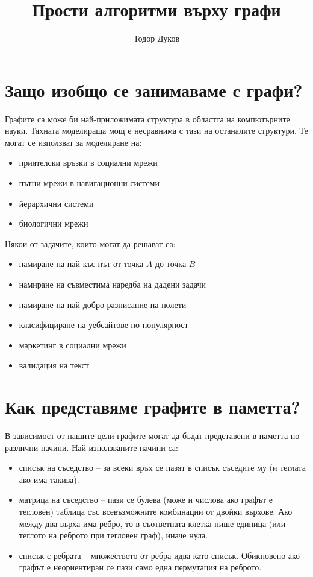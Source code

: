 \documentclass{article}
\title{Прости алгоритми върху графи}
\author{Тодор Дуков}
\date{}
\theoremstyle{definition}
\theoremstyle{plain}
\theoremstyle{remark}
\theoremstyle{definition}
\begin{document}
\maketitle

\section*{Защо изобщо се занимаваме с графи?}

Графите са може би най-приложимата структура в областта на компютърните науки.
Тяхната моделираща мощ е несравнима с тази на останалите структури.
Те могат се използват за моделиране на:
\begin{itemize}
  \item приятелски връзки в социални мрежи
  \item пътни мрежи в навигационни системи
  \item йерархични системи
  \item биологични мрежи
\end{itemize}
Някои от задачите, които могат да решават са:
\begin{itemize}
  \item намиране на най-къс път от точка $A$ до точка $B$
  \item намиране на съвместима наредба на дадени задачи
  \item намиране на най-добро разписание на полети
  \item класифициране на уебсайтове по популярност
  \item маркетинг в социални мрежи
  \item валидация на текст
\end{itemize}

\section*{Как представяме графите в паметта?}

В зависимост от нашите цели графите могат да бъдат представени в паметта по различни начини.
Най-използваните начини са:
\begin{itemize}
  \item списък на съседство -- за всеки връх се пазят в списък съседите му (и теглата ако има такива).
  \item матрица на съседство -- пази се булева (може и числова ако графът е тегловен) таблица със всевъзможните комбинации от двойки върхове.
        Ако между два върха има ребро, то в съответната клетка пише единица (или теглото на реброто при тегловен граф), иначе нула.
  \item списък с ребрата -- множеството от ребра идва като списък. Обикновено ако графът е неориентиран се пази само една пермутация на реброто.
\end{itemize}
\end{document}
